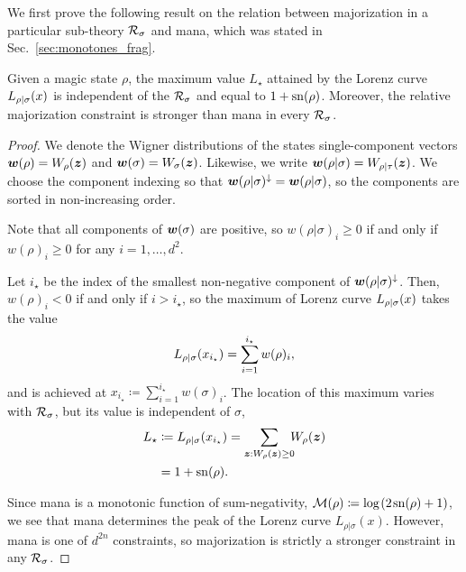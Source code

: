 \documentclass[pra,
aps,
twocolumn,
superscriptaddress,
groupedaddress,
nofootinbib,
reprint
]{revtex4-1}
\begin{document}
We first prove the following result on the relation between majorization in a particular sub-theory ${\mathcal R}_\sigma$ and mana, which was stated in Sec.~\ref{sec:monotones_frag}.
\begingroup
\def\thetheorem{\ref{lem:lcmax}}
\begin{theorem}
	Given a magic state $\rho$, the maximum value $L_\star$ attained by the Lorenz curve ${L_{\rho|\sigma}}(x)$ is independent of the ${\mathcal R}_\sigma$ and equal to $1+{{\rm{sn}}(\rho)}$. Moreover, the relative majorization constraint is stronger than mana in every ${\mathcal R}_\sigma$.
\end{theorem}
\addtocounter{theorem}{-1}
\endgroup
\begin{proof}
	We denote the Wigner distributions of the states single-component vectors $\boldsymbol{w}(\rho)=W_\rho(\boldsymbol{z})$ and $ \boldsymbol{w}(\sigma)=W_\sigma(\boldsymbol{z})$. Likewise, we write $\boldsymbol{w}(\rho|\sigma) = W_{\rho|\tau}(\bm{z})$.
	We choose the component indexing so that $\boldsymbol{w}(\rho|\sigma)^\downarrow = \boldsymbol{w}(\rho|\sigma)$, so the components are sorted in non-increasing order.

Note that all components of $\bm{w}(\sigma)$ are positive, so $w(\rho|\sigma)_i \geq 0$ if and only if $w(\rho)_i \geq 0$ for any $i=1,\dots,d^2$.
	
	Let $i_\star$ be the index of the smallest non-negative component of $\boldsymbol{w}(\rho|\sigma)^\downarrow$.
	Then, $w(\rho)_i < 0$ if and only if $i > i_\star$, so the maximum of Lorenz curve ${L_{\rho|\sigma}}(x)$ takes the value 
	\begin{equation}
		{L_{\rho|\sigma}}(x_{i_\star}) = \sum_{i=1}^{i_\star} w(\rho)_i,
	\end{equation}
	and is achieved at $x_{i_\star} \coloneqq \sum_{i=1}^{i_\star} w(\sigma)_i$. The location of this maximum varies with ${\mathcal R}_\sigma$, but its value is independent of $\sigma$,
	\begin{align}
	L_\star &\coloneqq	\lc{\rho}{\sigma}(x_{i_\star}) 
		= \sum\limits_{\bmz: \W[\bmz]{\rho} \geq 0}\hspace{-5pt} \W[\bmz]{\rho} \nonumber \\
		&= 1 + \sn{\rho}.
	\end{align}
	
Since mana is a monotonic function of sum-negativity, ${\mathcal M}(\rho) \coloneqq \log \hspace{1pt}(2\hspace{1pt}{{\rm{sn}}(\rho)}+1)$, we see that mana determines the peak of the Lorenz curve $L_{\rho|\sigma}(x)$. However, mana is one of $d^{2n}$ constraints, so majorization is strictly a stronger constraint in any ${\mathcal R}_\sigma$.
\end{proof}
\end{document}
